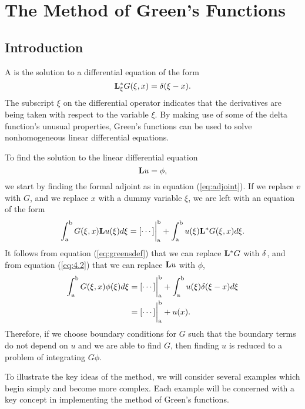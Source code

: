 \section{The Method of Green's Functions}
\setcounter{example}{0}
\subsection{Introduction}
A  is the solution to a differential equation of the form
\begin{equation} \label{eq:greensdef}
    \mathrm{\bf{L^*_\xi}} G(\xi, x) = \delta(\xi - x). 
\end{equation}
The subscript \(\xi\) on the differential operator indicates that the derivatives are being taken with respect to the variable \(\xi\). By making use of some of the delta function's unusual properties, Green's functions can be used to solve nonhomogeneous linear differential equations.

To find the solution to the linear differential equation
\begin{equation} \label{eq:4.2}
    \mathrm{\bf{L}}u=\phi,
\end{equation}
we start by finding the formal adjoint as in equation (\ref{eq:adjoint}). If we replace \(v\) with \(G\), and we replace \(x\) with a dummy variable \(\xi\), we are left with an equation of the form
\begin{equation} \label{eq:greenadjoint}
    \int_\mathrm{a}^\mathrm{b} G(\xi, x)\mathrm{\bf{L}}u(\xi) d\xi = [\cdots]\biggr\rvert_\mathrm{a}^\mathrm{b} + \int_\mathrm{a}^\mathrm{b} u(\xi)\mathrm{\bf{L^*}}G(\xi,x) d\xi.
\end{equation} 
It follows from equation (\ref{eq:greensdef}) that we can replace \(\mathrm{\bf{L^*}}G\) with \(\delta\), and from equation (\ref{eq:4.2}) that we can replace \(\mathrm{\bf{L}}u\) with \(\phi\), 
\begin{equation}
    \begin{split}
        \int_\mathrm{a}^\mathrm{b} G(\xi,x)\phi(\xi) d\xi &= [\cdots]\biggr\rvert_\mathrm{a}^\mathrm{b} + \int_\mathrm{a}^\mathrm{b} u(\xi)\delta(\xi-x) d\xi\\
        &=[\cdots]\biggr\rvert_\mathrm{a}^\mathrm{b} + u(x).
    \end{split}
\end{equation}
Therefore, if we choose boundary conditions for \(G\) such that the boundary terms do not depend on \(u\) and we are able to find \(G\), then finding \(u\) is reduced to a problem of integrating \(G\phi\). 

To illustrate the key ideas of the method, we will consider several examples which begin simply and become more complex. Each example will be concerned with a key concept in implementing the method of Green's functions.
